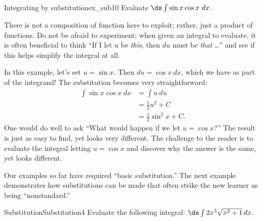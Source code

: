 
\begin{example}{Integrating by substitution}{ex_sub10}
{
Evaluate $\ds \int \sin x\cos x\ dx$.
}
\end{example}

\begin{solution}
{There is not a composition of function here to exploit; rather, just a product of functions. Do not be afraid to experiment; when given an integral to evaluate, it is often beneficial to think ``If I let $u$ be \textit{this}, then $du$ must be \textit{that} \ldots'' and see if this helps simplify the integral at all.

In this example, let's set $u = \sin x$. Then $du = \cos x\ dx$, which we have as part of the integrand! The substitution becomes very straightforward:
		\begin{align*}
		\int \sin x\cos x\ dx &=	\int u\ du \\
											&= \frac12u^2+ C \\
											&= \frac12\sin^2 x + C.
		\end{align*}
One would do well to ask ``What would happen if we let $u = \cos x$?'' The result is just as easy to find, yet looks very different. The challenge to the reader is to evaluate the integral letting $u = \cos x$ and discover why the answer is the same, yet looks different.
}
\end{solution}



Our examples so far have required ``basic substitution.'' The next example demonstrates how substitutions can be made that often strike the new learner as being ``nonstandard.''\\



\begin{example}{Substitution}{Substitution4}
Evaluate the following integral:
$\ds\int 2x^3\sqrt{x^2+1}\,dx.$
\end{example}

